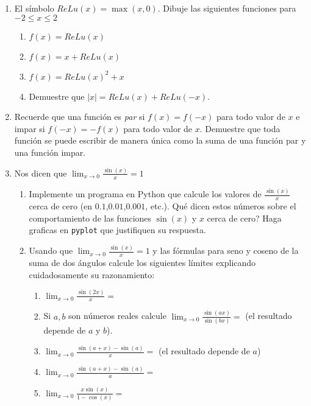 \documentclass[12pt, a4paper]{article}
\begin{document}
\begin{enumerate}
\item El símbolo $ReLu(x)=\max(x,0)$. Dibuje las siguientes funciones para $-2\leq x\leq 2$
\begin{enumerate}
\item $f(x)=ReLu(x)$
\item $f(x)=x+ReLu(x)$
\item $f(x)=ReLu(x)^2+x$
\item Demuestre que $|x|=ReLu(x)+ReLu(-x)$.
\end{enumerate}

\item Recuerde que una función es \emph{par} si $f(x)=f(-x)$ para todo valor de $x$ e impar si $f(-x)=-f(x)$ para todo valor de $x$. Demuestre que toda función se puede escribir de manera única como la suma de una función par y una función impar.


\item Nos dicen que $\lim_{x\rightarrow 0}\frac{\sin(x)}{x}=1$ 
\begin{enumerate}
\item Implemente un programa en Python que calcule los valores de $\frac{\sin(x)}{x}$ cerca de cero (en $0.1$,$0.01$,$0.001$, etc.). Qué dicen estos números sobre el comportamiento de las funciones $\sin(x)$ y $x$ cerca de cero? Haga graficas en \verb!pyplot! que justifiquen su respuesta.

\item Usando que $\lim_{x\rightarrow 0}\frac{\sin(x)}{x}=1$ y las fórmulas para seno y coseno de la suma de dos ángulos calcule los siguientes límites explicando cuidadosamente su razonamiento:

\begin{enumerate}
\item $\lim_{x\rightarrow 0} \frac{\sin(2x)}{x}=$ 
\item Si $a,b$ son números reales calcule $\lim_{x\rightarrow 0} \frac{\sin(ax)}{\sin(bx)}=$ (el resultado depende de $a$ y $b$).
\item $\lim_{x\rightarrow 0} \frac{\sin(a+x)-\sin(a)}{x}=$ (el resultado depende de $a$) 
\item $\lim_{x\rightarrow 0} \frac{\sin(a+x)-\sin(a)}{a}=$  
\item $\lim_{x\rightarrow 0} \frac{x\sin(x)}{1-\cos(x)}=$

\end{enumerate}

\end{enumerate}




\end{enumerate}
\end{document}
